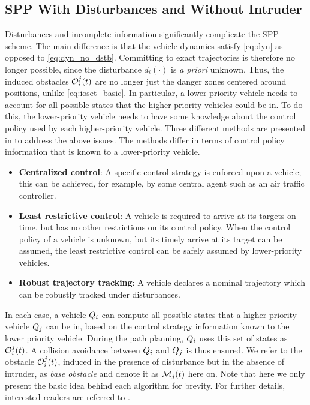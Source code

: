 \subsection{SPP With Disturbances and Without Intruder\label{sec:distb}}
Disturbances and incomplete information significantly complicate the SPP scheme. The main difference is that the vehicle dynamics satisfy \eqref{eq:dyn} as opposed to \eqref{eq:dyn_no_dstb}. Committing to exact trajectories is therefore no longer possible, since the disturbance $d_i(\cdot)$ is \textit{a priori} unknown. Thus, the induced obstacles $\mathcal{O}_i^j(t)$ are no longer just the danger zones centered around positions, unlike \eqref{eq:ioset_basic}. In particular, a lower-priority vehicle needs to account for all possible states that the higher-priority vehicles could be in. To do this, the lower-priority vehicle needs to have some knowledge about the control policy used by each higher-priority vehicle. Three different methods are presented in \cite{Bansal2017} to address the above issues. The methods differ in terms of control policy information that is known to a lower-priority vehicle.
\begin{itemize}
\item \textbf{Centralized control}: A specific control strategy is enforced upon a vehicle; this can be achieved, for example, by some central agent such as an air traffic controller. 
\item \textbf{Least restrictive control}: A vehicle is required to arrive at its targets on time, but has no other restrictions on its control policy. When the control policy of a vehicle is unknown, but its timely arrive at its target can be assumed, the least restrictive control can be safely assumed by lower-priority vehicles.
\item \textbf{Robust trajectory tracking}: A vehicle declares a nominal trajectory which can be robustly tracked under disturbances.
\end{itemize}
In each case, a vehicle $Q_i$ can compute all possible states that a higher-priority vehicle $Q_j$ can be in, based on the control strategy information known to the lower priority vehicle. During the path planning, $Q_i$ uses this set of states as $\mathcal{O}_i^j(t)$. A collision avoidance between $Q_i$ and $Q_j$ is thus ensured. We refer to the obstacle $\mathcal{O}_i^j(t)$, induced in the presence of disturbance but in the absence of intruder, as \textit{base obstacle} and denote it as $\mathcal{M}_j(t)$ here on. Note that here we only present the basic idea behind each algorithm for brevity. For further details, interested readers are referred to \cite{Bansal2017}.
